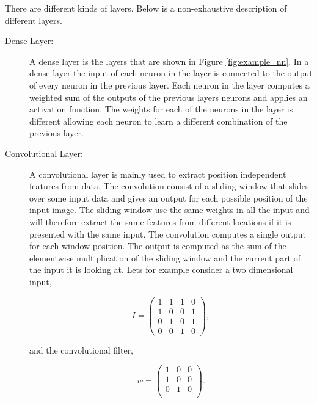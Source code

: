 There are different kinds of layers. Below is a non-exhaustive description of
different layers.

\begin{description}
    \item[Dense Layer:] A dense layer is the layers that are shown in Figure
        \ref{fig:example_nn}. In a dense layer the input of each neuron in the
        layer is connected to the output of every neuron in the previous layer.
        Each neuron in the layer computes a weighted sum of the outputs of the
        previous layers neurons and applies an activation function. The weights
        for each of the neurons in the layer is different allowing each neuron
        to learn a different combination of the previous layer.
    \item[Convolutional Layer:] A convolutional layer is mainly used to extract
        position independent features from data. The convolution consist of a
        sliding window that slides over some input data and gives an output for
        each possible position of the input image. The sliding window use the
        same weights in all the input and will therefore extract the same
        features from different locations if it is presented with the same
        input. The convolution computes a single output for each window
        position. The output is computed as the sum of the elementwise
        multiplication of the sliding window and the current part of the input
        it is looking at. Lets for example consider a two dimensional input,

        \begin{equation}
            I = \begin{pmatrix}
                1 & 1 & 1 & 0 \\
                1 & 0 & 0 & 1 \\
                0 & 1 & 0 & 1 \\
                0 & 0 & 1 & 0
            \end{pmatrix},
        \end{equation}

        and the convolutional filter,

        \begin{equation}
            w = \begin{pmatrix}
                1 & 0 & 0 \\
                1 & 0 & 0 \\
                0 & 1 & 0 \\
            \end{pmatrix}.
        \end{equation}


\end{description}
